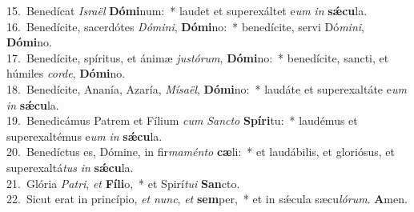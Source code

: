 {15.~}Benedícat \textit{Is}\textit{ra}\textit{ël} \textbf{Dó}\textbf{mi}num:~* laudet et superexáltet e\textit{um} \textit{in} \textbf{sǽ}\textbf{cu}la.\\
{16.~}Benedícite, sacerdótes \textit{Dó}\textit{mi}\textit{ni}, \textbf{Dó}\textbf{mi}no:~* benedícite, servi Dó\textit{mi}\textit{ni}, \textbf{Dó}\textbf{mi}no.\\
{17.~}Benedícite, spíritus, et ánimæ \textit{ju}\textit{stó}\textit{rum}, \textbf{Dó}\textbf{mi}no:~* benedícite, sancti, et húmiles \textit{cor}\textit{de}, \textbf{Dó}\textbf{mi}no.\\
{18.~}Benedícite, Ananía, Azaría, \textit{Mí}\textit{sa}\textit{ël}, \textbf{Dó}\textbf{mi}no:~* laudáte et superexaltáte e\textit{um} \textit{in} \textbf{sǽ}\textbf{cu}la.\\
{19.~}Benedicámus Patrem et Fílium \textit{cum} \textit{San}\textit{cto} \textbf{Spí}\textbf{ri}tu:~* laudémus et superexaltémus e\textit{um} \textit{in} \textbf{sǽ}\textbf{cu}la.\\
{20.~}Benedíctus es, Dómine, in fir\textit{ma}\textit{mén}\textit{to} \textbf{cæ}li:~* et laudábilis, et gloriósus, et superexaltá\textit{tus} \textit{in} \textbf{sǽ}\textbf{cu}la.\\
{21.~}Glória \textit{Pa}\textit{tri}, \textit{et} \textbf{Fí}\textbf{li}o,~* et Spirí\textit{tu}\textit{i} \textbf{San}cto.\\
{22.~}Sicut erat in princípio, \textit{et} \textit{nunc}, \textit{et} \textbf{sem}per,~* et in sǽcula sæcu\textit{ló}\textit{rum}. \textbf{A}men.\\
